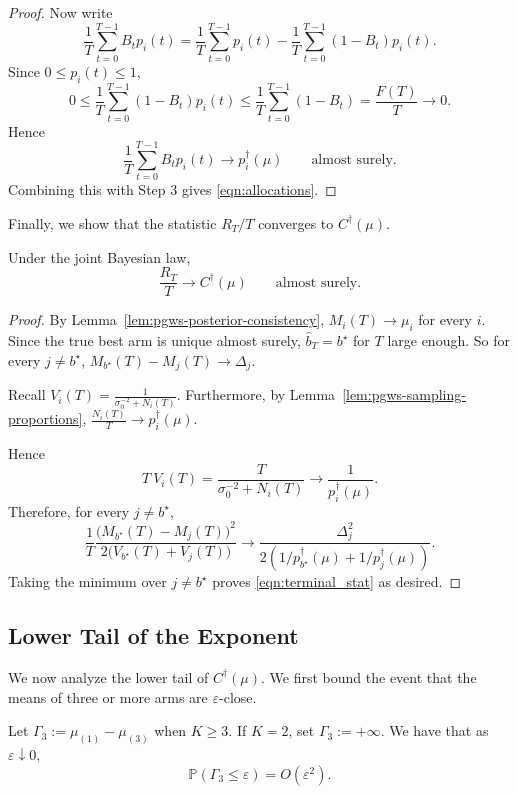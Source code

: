 \documentclass[10pt]{article}
\theoremstyle{plain}
\begin{document}
\begin{proof}
Now write
\[
\frac1T\sum_{t=0}^{T-1}B_t p_i(t)
=
\frac1T\sum_{t=0}^{T-1}p_i(t)
-
\frac1T\sum_{t=0}^{T-1}(1-B_t)p_i(t).
\]
Since $0\le p_i(t)\le1$,
\[
0\le
\frac1T\sum_{t=0}^{T-1}(1-B_t)p_i(t)
\le
\frac1T\sum_{t=0}^{T-1}(1-B_t)
=
\frac{F(T)}{T}
\to0.
\]
Hence
\[
\frac1T\sum_{t=0}^{T-1}B_t p_i(t)
\to
p_i^\dagger(\mu)
\qquad\text{almost surely}.
\]
Combining this with Step 3 gives \eqref{eqn:allocations}.  
\end{proof}
Finally, we show that the statistic $R_T/T$ converges to $ C^\dagger(\mu)$.

\begin{lemma}
\label{lem:RT-converges}
Under the joint Bayesian law,
\begin{equation}
    \frac{R_T}{T}
\to
C^\dagger(\mu)
\qquad\text{almost surely}. \label{eqn:terminal_stat}
\end{equation} 
\end{lemma}

\begin{proof}
By Lemma~\ref{lem:pgws-posterior-consistency}, $M_i(T)\to \mu_i$ for every $i$.
Since the true best arm is unique almost surely, $\widehat b_T=b^\star$ for $T$ large enough.
So for every $j\neq b^\star$,
$M_{b^\star}(T)-M_j(T)\to \Delta_j$.

Recall $V_i(T)=\frac{1}{\sigma_0^{-2}+N_i(T)}$.
Furthermore, by Lemma~\ref{lem:pgws-sampling-proportions},
$\frac{N_i(T)}{T}\to p_i^\dagger(\mu)$.

Hence
\[
T\ V_i(T)
=
\frac{T}{\sigma_0^{-2}+N_i(T)}
\to
\frac{1}{p_i^\dagger(\mu)}.
\]
Therefore, for every $j\neq b^\star$,
\[
\frac1T
\frac{
\bigl(M_{b^\star}(T)-M_j(T)\bigr)^2
}{
2\bigl(V_{b^\star}(T)+V_j(T)\bigr)
}
\to
\frac{
\Delta_j^2
}{
2\left(
1/p_{b^\star}^\dagger(\mu)+1/p_j^\dagger(\mu)
\right)
}.
\]
Taking the minimum over $j\neq b^\star$ proves \eqref{eqn:terminal_stat} as desired.  
\end{proof}






\subsection{Lower Tail of the  Exponent}

We now analyze the  lower tail of $C^\dagger(\mu)$. We first bound the event that the means of three or more arms are $\varepsilon$-close. %
\begin{lemma}
\label{lem:triple-near-tie}
Let $\Gamma_3:=\mu_{(1)}-\mu_{(3)}$ when $K\ge3$. If $K=2$, set $\Gamma_3:=+\infty$. We have that as $\varepsilon\downarrow0$,
\[
\mathbb P(\Gamma_3\le \varepsilon)=O(\varepsilon^2).
\]
\end{lemma}
\end{document}
